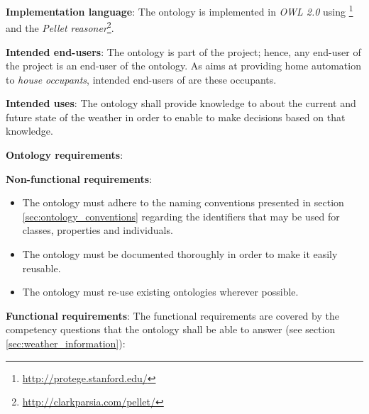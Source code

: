 \begin{mdframed}[linewidth=.6pt]
\vspace{.2cm}

\textbf{Implementation language}: The ontology is implemented in \emph{OWL 2.0}\cite{OWL} using \protege\footnote{\href{http://protege.stanford.edu/}{http://protege.stanford.edu/}} and the \emph{Pellet reasoner}\footnote{\href{http://clarkparsia.com/pellet/}{http://clarkparsia.com/pellet/}}.

\vspace{.2cm}

\textbf{Intended end-users}: The ontology is part of the \thinkhome project; hence, any end-user of the \thinkhome project is an end-user of the \thinkhomeweather ontology. As \thinkhome aims at providing home automation to \emph{house occupants}, intended end-users of \thinkhomeweather are these occupants.

\vspace{.2cm}

\textbf{Intended uses}: The ontology shall provide knowledge to \thinkhome about the current and future state of the weather in order to enable \thinkhome to make decisions based on that knowledge.

\vspace{.2cm}

\textbf{Ontology requirements}:

\vspace{.2cm}

\setlength{\leftskip}{.5cm}

\textbf{Non-functional requirements}:

\begin{itemize}
  \item The ontology must adhere to the naming conventions presented in section \ref{sec:ontology_conventions} regarding the identifiers that may be used for classes, properties and individuals.
  \item The ontology must be documented thoroughly in order to make it easily reusable.
  \item The ontology must re-use existing ontologies wherever possible.
\end{itemize}

\textbf{Functional requirements}: The functional requirements are covered by the competency questions that the ontology shall be able to answer (see section \ref{sec:weather_information}):


\end{mdframed}
